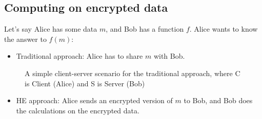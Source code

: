 \documentclass[
  letterpaper,
  DIV=11,
  numbers=noendperiod,
  oneside]{scrartcl}
\providecommand{\tightlist}{%
  \setlength{\itemsep}{0pt}\setlength{\parskip}{0pt}}\usepackage{longtable,booktabs,array}
\begin{document}
\subsection{Computing on encrypted
data}\label{computing-on-encrypted-data}

Let's say Alice has some data \(m\), and Bob has a function \(f\). Alice
wants to know the answer to \(f(m)\):

\begin{itemize}
\tightlist
\item
  Traditional approach: Alice has to share \(m\) with Bob.
\end{itemize}

\begin{figure}


\caption{\label{fig-traditional-approach-diagram}A simple client-server
scenario for the traditional approach, where C is Client (Alice) and S
is Server (Bob)}

\end{figure}%

\begin{itemize}
\tightlist
\item
  HE approach: Alice sends an encrypted version of \(m\) to Bob, and Bob
  does the calculations on the encrypted data.
\end{itemize}
\end{document}
